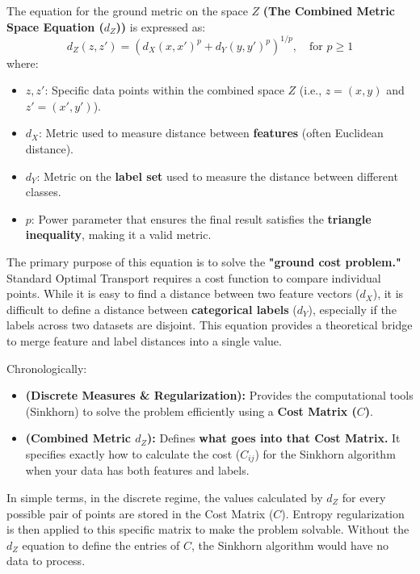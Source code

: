 \documentclass[11pt, a4paper]{article}
\theoremstyle{plain} %
\theoremstyle{definition} %
\begin{document}
			The equation for the ground metric on the space $Z$ \textbf{(The Combined Metric Space Equation ($d_Z$))} is expressed as:
			\begin{equation}
				\label{eq:combined_metric_space}
				d_Z(z, z') = \left(d_X(x, x')^p + d_Y(y, y')^p\right)^{1/p}, \quad \text{for } p \geq 1
			\end{equation}
			where:
			\begin{itemize}
				\item $z, z'$: Specific data points within the combined space $Z$ (i.e., $z = (x, y)$ and $z' = (x', y')$).
				\item $d_X$: Metric used to measure distance between \textbf{features} (often Euclidean distance).
				\item $d_Y$: Metric on the \textbf{label set} used to measure the distance between different classes.
				\item $p$: Power parameter that ensures the final result satisfies the \textbf{triangle inequality}, making it a valid metric.
			\end{itemize}
			The primary purpose of this equation is to solve the \textbf{"ground cost problem."} Standard Optimal Transport requires a cost function to compare individual points. While it is easy to find a distance between two feature vectors ($d_X$), it is difficult to define a distance between \textbf{categorical labels} ($d_Y$), especially if the labels across two datasets are disjoint. This equation provides a theoretical bridge to merge feature and label distances into a single value.

			Chronologically:
			\begin{itemize}
				\item \textbf{(Discrete Measures \& Regularization):} Provides the computational tools (Sinkhorn) to solve the problem efficiently using a \textbf{Cost Matrix ($C$)}.
				\item \textbf{(Combined Metric $d_Z$):} Defines \textbf{what goes into that Cost Matrix.} It specifies exactly how to calculate the cost ($C_{ij}$) for the Sinkhorn algorithm when your data has both features and labels.
			\end{itemize}
			In simple terms, in the discrete regime, the values calculated by $d_Z$ for every possible pair of points are stored in the Cost Matrix ($C$). Entropy regularization is then applied to this specific matrix to make the problem solvable. Without the $d_Z$ equation to define the entries of $C$, the Sinkhorn algorithm would have no data to process.
\end{document}

